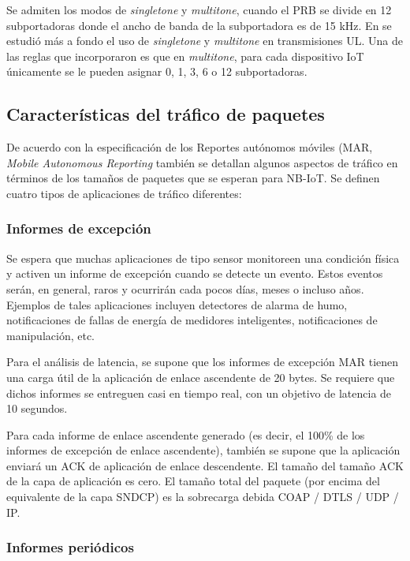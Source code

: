 Se admiten los modos de \textit{singletone} y \textit{multitone}, cuando el PRB se divide en 12 subportadoras donde el ancho de banda de la subportadora es de 15 kHz. En \parencite{Mostafa2019} se estudió más a fondo el uso de \textit{singletone} y \textit{multitone} en transmisiones UL. Una de las reglas que incorporaron es que en \textit{multitone}, para cada dispositivo IoT únicamente se le pueden asignar 0, 1, 3, 6 o 12 subportadoras.

\subsection{Características del tráfico de paquetes}

De acuerdo con la especificación de los Reportes autónomos móviles (MAR, \textit{Mobile Autonomous Reporting} también se detallan algunos aspectos de tráfico en términos de los tamaños de paquetes que se esperan para NB-IoT. Se definen cuatro tipos de aplicaciones de tráfico diferentes:
\subsubsection{Informes de excepción}

Se espera que muchas aplicaciones de tipo sensor monitoreen una condición física y activen un informe de excepción cuando se detecte un evento. Estos eventos serán, en general, raros y ocurrirán cada pocos días, meses o incluso años. Ejemplos de tales aplicaciones incluyen detectores de alarma de humo, notificaciones de fallas de energía de medidores inteligentes, notificaciones de manipulación, etc.\newline

Para el análisis de latencia, se supone que los informes de excepción MAR tienen una carga útil de la aplicación de enlace ascendente de 20 bytes. Se requiere que dichos informes se entreguen casi en tiempo real, con un objetivo de latencia de 10 segundos.\newline

Para cada informe de enlace ascendente generado (es decir, el 100\% de los informes de excepción de enlace ascendente), también se supone que la aplicación enviará un ACK de aplicación de enlace descendente. El tamaño del tamaño ACK de la capa de aplicación es cero. El tamaño total del paquete (por encima del equivalente de la capa SNDCP) es la sobrecarga debida COAP / DTLS / UDP / IP.

\subsubsection{Informes periódicos}\label{Informesperiodicos}

